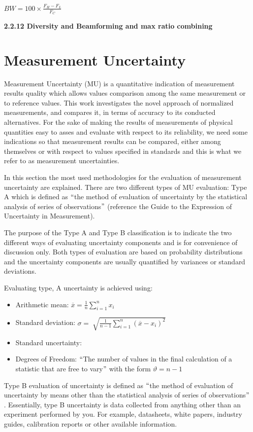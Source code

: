 {\fontsize{12pt}{14.4pt}\selectfont $BW=100  \times \frac{F_{H}-F_{L}}{F_{C}} $}

\textbf{2.2.12 Diversity and Beamforming and max ratio combining }


\section{Measurement Uncertainty}

Measurement Uncertainty (MU) is a quantitative indication of measurement results quality which allows values comparison among the same measurement or to reference values. This work investigates the novel approach of normalized measurements, and compares it, in terms of accuracy to its conducted alternatives. For the sake of making the results of measurements of physical quantities easy to asses and evaluate with respect to its reliability, we need some indications so that measurement results can be compared, either among themselves or with respect to values specified in standards and this is what we refer to as measurement uncertainties. 

In this section the most used methodologies for the evaluation of measurement uncertainty are explained. There are two different types of MU evaluation: Type A which is defined as $``$the method of evaluation of uncertainty by the statistical analysis of series of observations$"$  (reference the Guide to the Expression of Uncertainty in Measurement).

The purpose of the Type A and Type B classification is to indicate the two different ways of evaluating uncertainty components and is for convenience of discussion only. Both types of evaluation are based on probability distributions and the uncertainty components are usually quantified by variances or standard deviations.

Evaluating type, A uncertainty is achieved using:

\begin{itemize}
	\item Arithmetic mean:  $\overline{x}=\frac{1}{n} \sum _{i=1}^{n}x_{i}$

	\item Standard deviation: $\sigma = \sqrt[]{\frac{1}{n-1} \sum _{i=1}^{n} \left( \overline{x}-x_{i} \right) ^{2}}$

	\item Standard uncertainty:

	\item Degrees of Freedom: $``$The number of values in the final calculation of a statistic that are free to vary$"$  with the form  $\vartheta =n-1$
\end{itemize}


Type B evaluation of uncertainty is defined as $``$the method of evaluation of uncertainty by means other than the statistical analysis of series of observations$"$ . Essentially, type B uncertainty is data collected from anything other than an experiment performed by you. For example, datasheets, white papers, industry guides, calibration reports or other available information.
